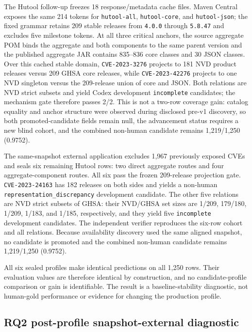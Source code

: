 The Hutool follow-up freezes 18 response/metadata cache files. Maven Central exposes the same 214 tokens for \texttt{hutool-all}, \texttt{hutool-core}, and \texttt{hutool-json}; the fixed grammar retains 209 stable releases from \texttt{4.0.0} through \texttt{5.8.47} and excludes five milestone tokens. At all three critical anchors, the source aggregate POM binds the aggregate and both components to the same parent version and the published aggregate JAR contains 835--836 core classes and 30 JSON classes. Over this cached stable domain, \texttt{CVE-2023-3276} projects to 181 NVD product releases versus 209 GHSA core releases, while \texttt{CVE-2023-42276} projects to one NVD singleton versus the 209-release union of core and JSON. Both relations are NVD strict subsets and yield Codex development \texttt{incomplete} candidates; the mechanism gate therefore passes 2/2. This is not a two-row coverage gain: catalog equality and anchor structure were observed during disclosed pre-v1 discovery, so both promoted-candidate fields remain null, the advancement status requires a new blind cohort, and the combined non-human candidate remains 1,219/1,250 (0.9752).

The same-snapshot external application excludes 1,967 previously exposed CVEs and seals six remaining Hutool rows: two direct aggregate routes and four aggregate-component routes. All six pass the frozen 209-release projection gate. \texttt{CVE-2023-24163} has 182 releases on both sides and yields a non-human \texttt{representation\_discrepancy} development candidate. The other five relations are NVD strict subsets of GHSA: their NVD/GHSA set sizes are 1/209, 179/180, 1/209, 1/183, and 1/185, respectively, and they yield five \texttt{incomplete} development candidates. The independent verifier reproduces the six-row cohort and all relations. Because availability discovery used the same aligned snapshot, no candidate is promoted and the combined non-human candidate remains 1,219/1,250 (0.9752).

All six sealed profiles make identical predictions on all 1,250 rows. Their evaluation values are therefore identical by construction, and no candidate-profile comparison or gain is identifiable. The result is a baseline-stability diagnostic, not human-gold performance or evidence for changing the production profile.

\subsection{RQ2 post-profile snapshot-external diagnostic}

